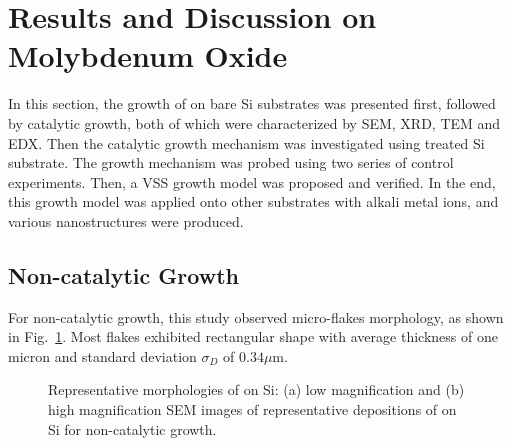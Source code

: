 \section{Results and Discussion on Molybdenum Oxide}\label{sec:result}
In this section, the growth of  on bare Si substrates was presented first, followed by catalytic growth, both of which were characterized by SEM, XRD, TEM and EDX. Then the catalytic growth mechanism was investigated using  treated Si substrate. The growth mechanism was probed using two series of control experiments. Then, a VSS growth model was proposed and verified. In the end, this growth model was applied onto other substrates with alkali metal ions, and various  nanostructures were produced.

\subsection{Non-catalytic Growth}\label{sec:nonsi}

For  non-catalytic growth, this study observed micro-flakes morphology, as shown in Fig.~\ref{fig:mosisem}. Most flakes exhibited rectangular shape with average thickness of one micron and standard deviation $\sigma_D$ of $0.34 \mu$m.
\begin{figure}[htb]
\centering
{}\hspace{0.04\textwidth}
\caption[Representative morphologies of  on Si]{Representative morphologies of  on Si: (a) low magnification and (b) high magnification SEM images of representative depositions of  on Si for non-catalytic growth.}
\label{fig:mosisem}
\end{figure}

